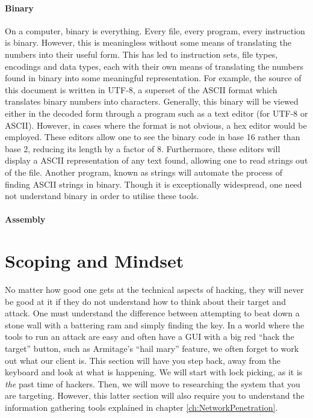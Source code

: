 \documentclass[a4paper,11pt]{report}
\begin{document}
		\subsubsection{Binary}
			On a computer, binary is everything.
			Every file, every program, every instruction is binary. 
			However, this is meaningless without some means of translating the numbers into their useful form. 
			This has led to instruction sets, file types, encodings and data types, each with their own means of translating the numbers found in binary into some meaningful representation. 
			For example, the source of this document is written in UTF-8, a superset of the ASCII format which translates binary numbers into characters. 
			Generally, this binary will be viewed either in the decoded form through a program such as a text editor (for UTF-8 or ASCII). 
			However, in cases where the format is not obvious, a hex editor would be employed. 
			These editors allow one to see the binary code in base 16 rather than base 2, reducing its length by a factor of 8. 
			Furthermore, these editors will display a ASCII representation of any text found, allowing one to read strings out of the file. 
			Another program, known as strings will automate the process of finding ASCII strings in binary. 
			Though it is exceptionally widespread, one need not understand binary in order to utilise these tools. 
		\subsubsection{Assembly}
\chapter{Scoping and Mindset}
	\label{ch:ScopingMindset}
		No matter how good one gets at the technical aspects of hacking, they will never be good at it if they do not understand how to think about their target and attack. 
		One must understand the difference between attempting to beat down a stone wall with a battering ram and simply finding the key. 
		In a world where the tools to run an attack are easy and often have a GUI with a big red ``hack the target'' button, such as Armitage's ``hail mary'' feature, 
		we often forget to work out what our client is. 
		This section will have you step back, away from the keyboard and look at what is happening. 
		We will start with lock picking, as it is \emph{the} past time of hackers. 
		Then, we will move to researching the system that you are targeting. 
		However, this latter section will also require you to understand the information gathering tools explained in chapter \ref{ch:NetworkPenetration}.
\end{document}
